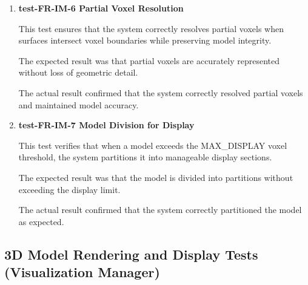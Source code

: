 \documentclass[12pt, titlepage]{article}
\begin{document}
\begin{enumerate}
\item \textbf{test-FR-IM-6 Partial Voxel Resolution}

\hspace{1.5em} This test ensures that the system correctly resolves partial voxels when surfaces intersect voxel boundaries while preserving model integrity.

The expected result was that partial voxels are accurately represented without loss of geometric detail.

The actual result confirmed that the system correctly resolved partial voxels and maintained model accuracy.


\item \textbf{test-FR-IM-7 Model Division for Display}

\hspace{1.5em} This test verifies that when a model exceeds the MAX\_DISPLAY voxel threshold, the system partitions it into manageable display sections.

The expected result was that the model is divided into partitions without exceeding the display limit.

The actual result confirmed that the system correctly partitioned the model as expected.

\end{enumerate}

\subsection{3D Model Rendering and Display Tests (Visualization Manager)}
\end{document}
